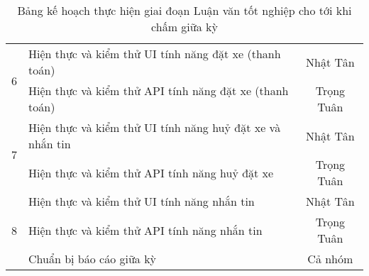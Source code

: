 \documentclass[../main.tex]{subfiles}
\begin{document}
\begin{table}[ht]
\begin{tabular}{| c | p{10cm} | c |}
			\multirow{2}{*}{6} & Hiện thực và kiểm thử UI tính năng đặt xe (thanh toán)
			& Nhật Tân
			\\
			\cline{2-3}
			& Hiện thực và kiểm thử API tính năng đặt xe (thanh toán)
			& Trọng Tuân
			\\
			\hline

			\multirow{2}{*}{7} & Hiện thực và kiểm thử UI tính năng huỷ đặt xe và nhắn tin
			& Nhật Tân
			\\
			\cline{2-3}
			& Hiện thực và kiểm thử API tính năng huỷ đặt xe
			& Trọng Tuân
			\\
			\hline

			\multirow{3}{*}{8} & Hiện thực và kiểm thử UI tính năng nhắn tin
			& Nhật Tân \\
			\cline{2-3}
			& Hiện thực và kiểm thử API tính năng nhắn tin
			& Trọng Tuân
			\\
			\cline{2-3}
			& Chuẩn bị báo cáo giữa kỳ
			& Cả nhóm
			\\
			\hline

		\end{tabular}
		\caption{\centering Bảng kế hoạch thực hiện giai đoạn Luận văn tốt nghiệp cho tới khi chấm giữa kỳ}
		\label{tab:thesis_plan}
	\end{table}
\end{document}
